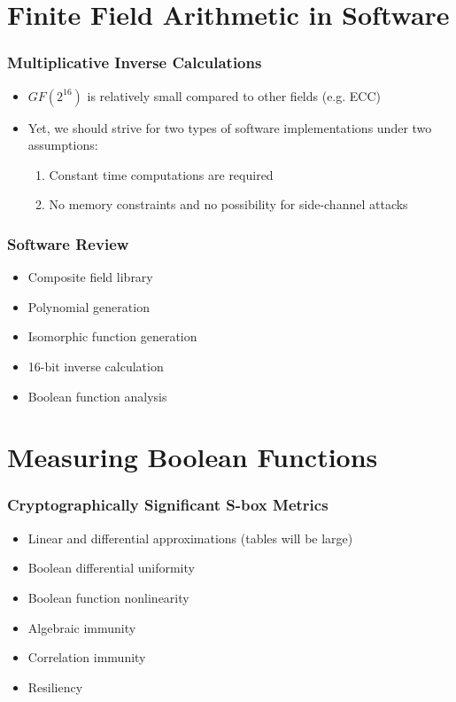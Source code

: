 \documentclass[handout]{beamer}
\begin{document}
\section{Finite Field Arithmetic in Software}
\begin{frame}
	\frametitle{Multiplicative Inverse Calculations}
	\begin{itemize}
		\item $GF(2^{16})$ is relatively small compared to other fields (e.g. ECC)
		\item Yet, we should strive for two types of software implementations under two assumptions:
		\begin{enumerate}
			\item Constant time computations are required  
			\item No memory constraints and no possibility for side-channel attacks
		\end{enumerate}
	\end{itemize}
\end{frame}

\begin{frame}
	\frametitle{Software Review}
	\begin{itemize}
		\item Composite field library
		\item Polynomial generation
		\item Isomorphic function generation 
		\item 16-bit inverse calculation
		\item Boolean function analysis
	\end{itemize}
\end{frame}

\section{Measuring Boolean Functions}
\begin{frame}
	\frametitle{Cryptographically Significant S-box Metrics}
	\begin{itemize}
		\item Linear and differential approximations (tables will be large)
		\item Boolean differential uniformity
		\item Boolean function nonlinearity
		\item Algebraic immunity
		\item Correlation immunity
		\item Resiliency
	\end{itemize}
\end{frame}
\end{document}
